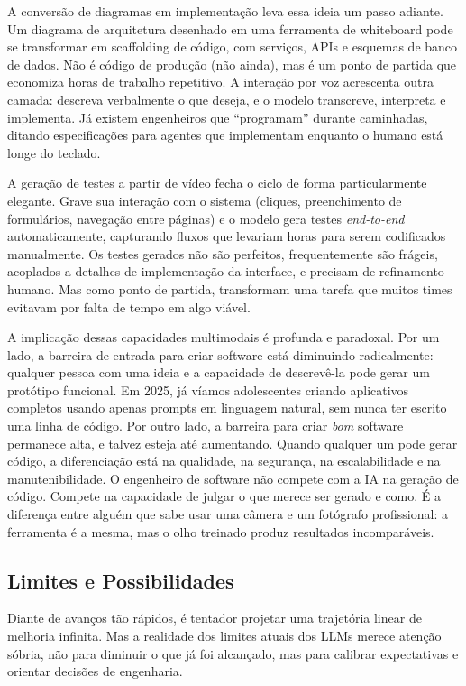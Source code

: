 A conversão de diagramas em implementação leva essa ideia um passo
adiante. Um diagrama de arquitetura desenhado em uma ferramenta de
whiteboard pode se transformar em scaffolding de código, com serviços,
APIs e esquemas de banco de dados. Não é código de produção (não
ainda), mas é um ponto de partida que economiza horas de trabalho
repetitivo. A interação por voz acrescenta outra camada: descreva
verbalmente o que deseja, e o modelo transcreve, interpreta e
implementa. Já existem engenheiros que ``programam'' durante caminhadas,
ditando especificações para agentes que implementam enquanto o humano
está longe do teclado.

A geração de testes a partir de vídeo fecha o ciclo de forma
particularmente elegante. Grave sua interação com o sistema (cliques,
preenchimento de formulários, navegação entre páginas) e o modelo
gera testes \textit{end-to-end} automaticamente, capturando fluxos que
levariam horas para serem codificados manualmente. Os testes gerados
não são perfeitos, frequentemente são frágeis, acoplados a detalhes
de implementação da interface, e precisam de refinamento humano. Mas
como ponto de partida, transformam uma tarefa que muitos times evitavam
por falta de tempo em algo viável.

A implicação dessas capacidades multimodais é profunda e paradoxal. Por
um lado, a barreira de entrada para criar software está diminuindo
radicalmente: qualquer pessoa com uma ideia e a capacidade de
descrevê-la pode gerar um protótipo funcional. Em 2025, já víamos
adolescentes criando aplicativos completos usando apenas prompts em
linguagem natural, sem nunca ter escrito uma linha de código. Por outro
lado, a barreira para criar \textit{bom} software permanece alta, e
talvez esteja até aumentando. Quando qualquer um pode gerar código, a
diferenciação está na qualidade, na segurança, na escalabilidade e na
manutenibilidade. O engenheiro de software não compete com a IA na
geração de código. Compete na capacidade de julgar o que merece ser
gerado e como. É a diferença entre alguém que sabe usar uma câmera e
um fotógrafo profissional: a ferramenta é a mesma, mas o olho treinado
produz resultados incomparáveis.

\subsection{Limites e Possibilidades}

Diante de avanços tão rápidos, é tentador projetar uma trajetória
linear de melhoria infinita. Mas a realidade dos limites atuais dos
LLMs merece atenção sóbria, não para diminuir o que já foi alcançado,
mas para calibrar expectativas e orientar decisões de engenharia.


